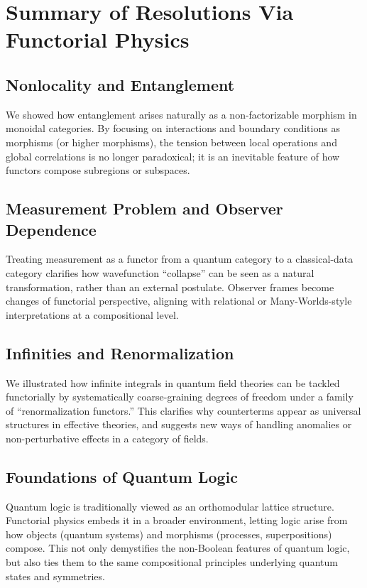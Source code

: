 \documentclass[12pt]{article}
\begin{document}
\section{Summary of Resolutions Via Functorial Physics}
\subsection{Nonlocality and Entanglement}
We showed how entanglement arises naturally as a non-factorizable morphism in monoidal categories. By focusing on interactions and boundary conditions as morphisms (or higher morphisms), the tension between local operations and global correlations is no longer paradoxical; it is an inevitable feature of how functors compose subregions or subspaces.

\subsection{Measurement Problem and Observer Dependence}
Treating measurement as a functor from a quantum category to a classical-data category clarifies how wavefunction ``collapse'' can be seen as a natural transformation, rather than an external postulate. Observer frames become changes of functorial perspective, aligning with relational or Many-Worlds-style interpretations at a compositional level.

\subsection{Infinities and Renormalization}
We illustrated how infinite integrals in quantum field theories can be tackled functorially by systematically coarse-graining degrees of freedom under a family of ``renormalization functors.'' This clarifies why counterterms appear as universal structures in effective theories, and suggests new ways of handling anomalies or non-perturbative effects in a category of fields.

\subsection{Foundations of Quantum Logic}
Quantum logic is traditionally viewed as an orthomodular lattice structure. Functorial physics embeds it in a broader environment, letting logic arise from how objects (quantum systems) and morphisms (processes, superpositions) compose. This not only demystifies the non-Boolean features of quantum logic, but also ties them to the same compositional principles underlying quantum states and symmetries.
\end{document}
